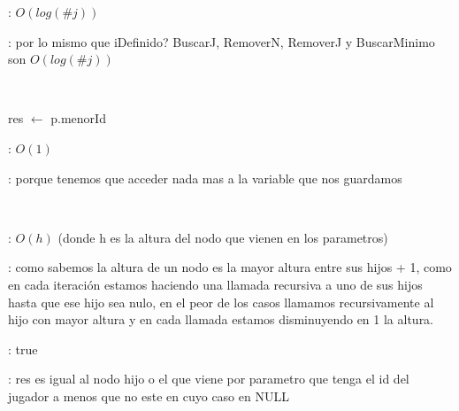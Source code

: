 \begin{Algoritmos}
	\complejidad: $O(log(\#j))$

	\justifcomp: por lo mismo que iDefinido? BuscarJ, RemoverN, RemoverJ y BuscarMinimo son $O(log(\#j))$ 

	~

	\begin{algorithm}[H]
		\NoCaptionOfAlgo
		\caption{}
		res $\leftarrow$ p.menorId
	\end{algorithm}

	\complejidad: $O(1)$

	\justifcomp: porque tenemos que acceder nada mas a la variable que nos guardamos

	~

	\begin{algorithm}[H]
		\NoCaptionOfAlgo
		\caption{}
	\end{algorithm}

	\complejidad: $O(h)$ (donde h es la altura del nodo que vienen en los parametros)

	\justifcomp: como sabemos la altura de un nodo es la mayor altura entre sus hijos + 1, como en cada iteración estamos haciendo una llamada recursiva a uno de sus hijos hasta que ese hijo sea nulo, en el peor de los casos llamamos recursivamente al hijo con mayor altura y en cada llamada estamos disminuyendo en 1 la altura.

	\pre: true

	\post: res es igual al nodo hijo o el que viene por parametro que tenga el id del jugador a menos que no este en cuyo caso en NULL

	~

	\begin{algorithm}[H]
		\NoCaptionOfAlgo
		\caption{}
	\end{algorithm}


\end{Algoritmos}
